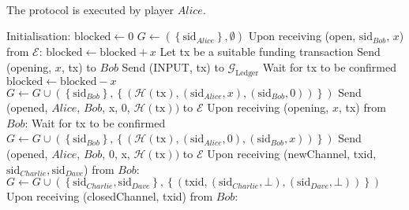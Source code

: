\ \\  The protocol is executed by player $Alice$.
  \label{alg:lightningprot}
  \begin{algorithmic}[1]
    \State Initialisation:
      \State $\mathrm{blocked} \leftarrow 0$
      \State $G \leftarrow \left(\left\{\mathrm{sid}_{Alice}\right\}, \emptyset\right)$
    \State
    \State Upon receiving (open, $\mathrm{sid}_{Bob}$, $x$) from $\mathcal{E}$:
        \State $\mathrm{blocked} \leftarrow \mathrm{blocked} + x$
        \State Let tx be a suitable funding transaction
        \State Send (opening, $x$, tx) to $Bob$
        \State Send (INPUT, tx) to $\mathcal{G}_{\mathrm{Ledger}}$
        \State Wait for tx to be confirmed 
        \State $\mathrm{blocked} \leftarrow \mathrm{blocked} - x$
        \State $G \leftarrow G \cup \left(\left\{\mathrm{sid}_{Bob}\right\},
        \left\{\left(\mathcal{H}\left(\mathrm{tx}\right), \left(\mathrm{sid}_{Alice},
        x\right), \left(\mathrm{sid}_{Bob}, 0\right)\right)\right\}\right)$ 
        \State Send (opened, $Alice$, $Bob$, x, 0, $\mathcal{H}\left(\mathrm{tx}\right))$
        to $\mathcal{E}$
      \EndIf
    \State
    \State Upon receiving (opening, $x$, tx) from $Bob$:
      \State Wait for tx to be confirmed
      \State $G \leftarrow G \cup \left(\left\{\mathrm{sid}_{Bob}\right\},
      \left\{\left(\mathcal{H}\left(\mathrm{tx}\right), \left(\mathrm{sid}_{Alice},
      0\right), \left(\mathrm{sid}_{Bob}, x\right)\right)\right\}\right)$ 
      \State Send (opened, $Alice$, $Bob$, 0, x, $\mathcal{H}\left(\mathrm{tx}\right))$ to
      $\mathcal{E}$
    \State
    \State Upon receiving (newChannel, txid, $\mathrm{sid}_{Charlie},
    \mathrm{sid}_{Dave}$) from $Bob$:
        \State $G \leftarrow G \cup \left(\left\{\mathrm{sid}_{Charlie},
        \mathrm{sid}_{Dave}\right\}, \left\{\left(\mathrm{txid},
        \left(\mathrm{sid}_{Charlie}, \bot\right), \left(\mathrm{sid}_{Dave},
        \bot\right)\right)\right\}\right)$ 
      \EndIf
    \State
    \State Upon receiving (closedChannel, txid) from $Bob$:

\end{algorithmic}
